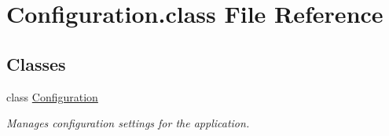 \hypertarget{Configuration_8class}{\section{Configuration.\-class File Reference}
\label{Configuration_8class}
}
\subsection*{Classes}
\begin{DoxyCompactItemize}
\item 
class \hyperlink{classConfiguration}{Configuration}
\begin{DoxyCompactList}\small\item\em Manages configuration settings for the application. \end{DoxyCompactList}\end{DoxyCompactItemize}
